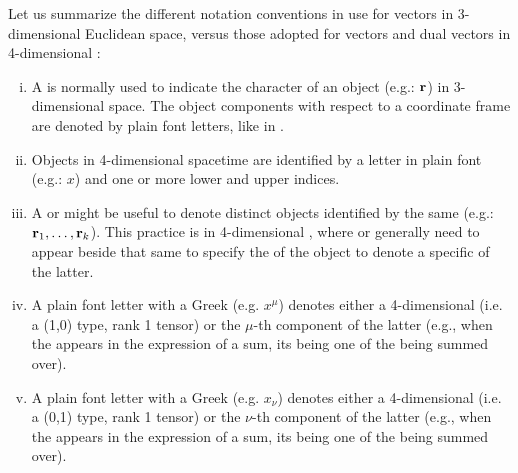 \parindent=0pt  %
\parbox{\textwidth}{\begin{mdframed}[style=MyFrame] %
Let us summarize the different notation conventions in use for vectors in 3-dimensional Euclidean space, versus those adopted for vectors and dual vectors in 4-dimensional :
\begin{enumerate}[i)]
\item A   is normally used to indicate the  character of an object (e.g.: $\vb{r}$) in 3-dimensional space. The object components with respect to a coordinate frame are denoted by plain font letters, like in 
.  
\item Objects in 4-dimensional spacetime are identified by a letter in plain font (e.g.: $x$) and one or more lower and upper indices. 
\item A  or  might be useful to denote distinct objects identified by the same  (e.g.: $\vb{r}_1, \ldots , \vb{r}_k$). This practice is  in 4-dimensional , where  or  generally need to appear beside that same  to specify  the  of the object  to denote a specific  of the latter.
\item A plain font letter with a Greek  (e.g. $x^\mu$) denotes either a 4-dimensional  (i.e. a (1,0) type, rank 1 tensor) or the $\mu$-th component of the latter (e.g., when the  appears in the expression of a sum, its  being one of the  being summed over).     
\item A plain font letter with a Greek  (e.g. $x_\nu$) denotes either a 4-dimensional  (i.e. a (0,1) type, rank 1 tensor) or the $\nu$-th component of the latter (e.g., when the  appears in the expression of a sum, its  being one of the  being summed over).  
\end{enumerate} 
\end{mdframed}} %
\parindent=10pt %

